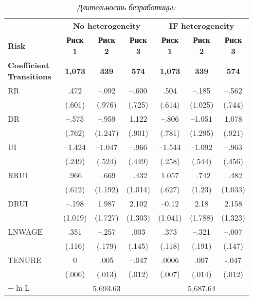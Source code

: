     \begin{table}[!htbp]\caption{\textit{Длительность безработицы: }}\label{tab:19.2}
    \begin{center}
\begin{tabular}{lcccccc}
\hline \hline
&\multicolumn{3}{c}{\textbf{No heterogeneity}}&\multicolumn{3}{c}{\textbf{IF heterogeneity}}\\
\cmidrule(r){2-4}\cmidrule(r){5-7}
\textbf{Risk}                    &\textbf{Риск 1} &\textbf{Риск 2} &\textbf{Риск 3} &\textbf{Риск 1} &\textbf{Риск 2} &\textbf{Риск 3}\\
\textbf{Coefficient Transitions} &\textbf{1,073}  &\textbf{339}    &\textbf{574}    &\textbf{1,073}  &\textbf{339}    &\textbf{574}\\
\hline
RR                  &.472   &--.092 &--.600 &.504   &--.185 &--.562 \\
                    &(.601) &(.976) &(.725) &(.614) &(1.025)&(.744) \\
DR                  &--.575 &--.959 &1.122  &--.806 &--1.051&1.078 \\
                    &(.762) &(1.247)&(.901) &(.781) &(1.295)&(.921) \\
UI                  &--1.424&--1.047&--.966 &--1.544&--1.092&--.963 \\
                    &(.249) &(.524) &(.449) &(.258) &(.544) &(.456) \\
RRUI                &.966   &--.669 &--.432 &1.057  &--.742 &--.482 \\
                    &(.612) &(1.192)&(1.014)&(.627) &(1.23) &(1.033) \\
DRUI                &--.198 &1.987  &2.102  &--0.12 &2.18   &2.158 \\
                    &(1.019)&(1.727)&(1.303)&(1.041)&(1.788)&(1.323) \\
LNWAGE              &.351   &--.257 &.003   &.373   &--.321 &--.007 \\
                    &(.116) &(.179) &(.145) &(.118) &(.191) &(.147) \\
TENURE              &0      &.005   &--.047 &.0006  &.007   &-.047 \\
                    &(.006) &(.013) &(.012) &(.007) &(.014) &(.012) \\
$-\ln\textrm{L}$    &\multicolumn{3}{c}{5,693.63}&\multicolumn{3}{c}{5,687.64} \\
\hline \hline
\end{tabular}
    \end{center}
    \end{table}


